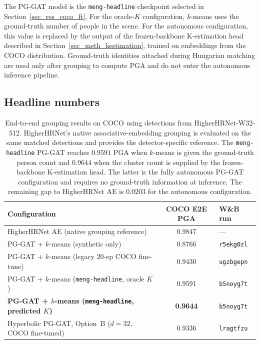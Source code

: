 The PG-GAT model is the \texttt{meng-headline} checkpoint selected in
Section~\ref{sec_res_coco_ft}.
For the oracle-$K$ configuration,
$k$-means uses the ground-truth number of people in the scene.
For the autonomous configuration,
this value is replaced by the output of the frozen-backbone
K-estimation head described in Section~\ref{sec_meth_kestimation},
trained on embeddings from the COCO distribution.
Ground-truth identities attached during Hungarian matching are used
only after grouping to compute PGA
and do not enter the autonomous inference pipeline.

\subsection{Headline numbers}
\label{sec_res_e2e_numbers}

\begin{table}[H]
\centering
\caption[End-to-end grouping results on COCO using detections from HigherHRNet-W32-512.]{End-to-end grouping results on COCO using detections from
HigherHRNet-W32-512. HigherHRNet's native associative-embedding
grouping is evaluated on the same matched detections and provides the
detector-specific reference. The \texttt{meng-headline} PG-GAT reaches
$0.9591$ PGA when $k$-means is given the ground-truth person count and
$0.9644$ when the cluster count is supplied by the frozen-backbone
K-estimation head. The latter is the fully autonomous PG-GAT
configuration and requires no ground-truth information at inference.
The remaining gap to HigherHRNet AE is $0.0203$ for the autonomous
configuration.}
\label{tab:e2e_headline}
\tablesize
\begin{tabular}{lcl}
\toprule
Configuration & COCO E2E PGA & W\&B run \\
\midrule
HigherHRNet AE (native grouping reference)
    & 0.9847 & --- \\
\midrule
PG-GAT + $k$-means (synthetic only)
    & 0.8766 & \texttt{r5ekg0zl} \\
PG-GAT + $k$-means (legacy 20-ep COCO fine-tune)
    & 0.9430 & \texttt{ugzbgepn} \\
PG-GAT + $k$-means (\texttt{meng-headline}, oracle $K$)
    & 0.9591 & \texttt{b5noyg7t} \\
\textbf{PG-GAT + $k$-means (\texttt{meng-headline}, predicted $K$)}
    & \textbf{0.9644} & \texttt{b5noyg7t} \\
\midrule
Hyperbolic PG-GAT, Option~B ($d=32$, COCO fine-tuned)
    & 0.9336 & \texttt{lragtfzu} \\
\bottomrule
\end{tabular}
\end{table}

